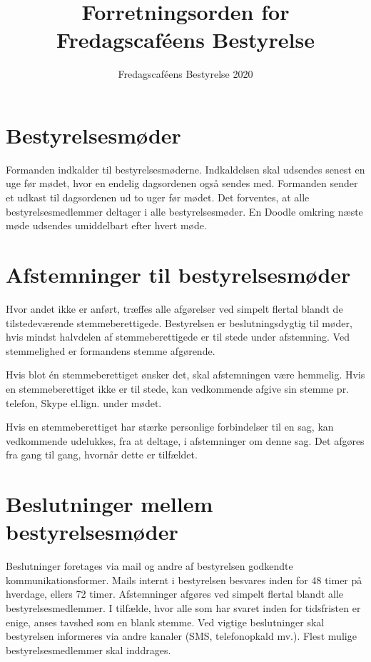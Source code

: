 

\title{Forretningsorden for Fredagscaféens Bestyrelse}
\author{Fredagscaféens Bestyrelse 2020}
\date{}

\renewcommand{\thesection}{§\arabic{section}}



\maketitle

\section{Bestyrelsesmøder}
Formanden indkalder til bestyrelsesmøderne. Indkaldelsen skal udsendes senest en uge før mødet, hvor en endelig dagsordenen også sendes med. Formanden sender et udkast til dagsordenen ud to uger før mødet. Det forventes, at alle bestyrelsesmedlemmer deltager i alle bestyrelsesmøder. En Doodle omkring næste møde udsendes umiddelbart efter hvert møde.

\section{Afstemninger til bestyrelsesmøder}
Hvor andet ikke er anført, træffes alle afgørelser ved simpelt flertal blandt de tilstedeværende stemmeberettigede. Bestyrelsen er beslutningsdygtig til møder, hvis mindst halvdelen af stemmeberettigede er til stede under afstemning. Ved stemmelighed er formandens stemme afgørende.

Hvis blot én stemmeberettiget ønsker det, skal afstemningen være hemmelig. Hvis en stemmeberettiget ikke er til stede, kan vedkommende afgive sin stemme pr. telefon, Skype el.lign. under mødet.

Hvis en stemmeberettiget har stærke personlige forbindelser til en sag, kan vedkommende udelukkes, fra at deltage, i afstemninger om denne sag. Det afgøres fra gang til gang, hvornår dette er tilfældet.

\section{Beslutninger mellem bestyrelsesmøder}
Beslutninger foretages via mail og andre af bestyrelsen godkendte kommunikationsformer. Mails internt i bestyrelsen besvares inden for 48 timer på hverdage, ellers 72 timer. Afstemninger afgøres ved simpelt flertal blandt alle bestyrelsesmedlemmer. I tilfælde, hvor alle som har svaret inden for tidsfristen er enige, anses tavshed som en blank stemme. Ved vigtige beslutninger skal bestyrelsen informeres via andre kanaler (SMS, telefonopkald mv.). Flest mulige bestyrelsesmedlemmer skal inddrages.

